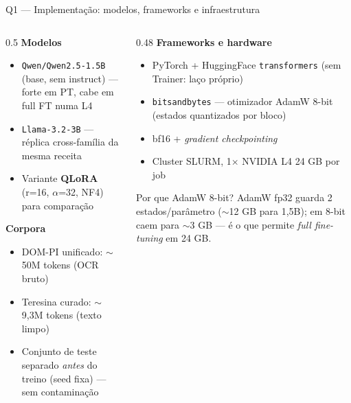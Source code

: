\documentclass[10pt,aspectratio=169]{beamer}
\begin{document}
\begin{frame}{Q1 — Implementação: modelos, frameworks e infraestrutura}
  \begin{columns}[T]
    \begin{column}{0.5\textwidth}
      \textbf{Modelos}
      \begin{itemize}\small
        \item \texttt{Qwen/Qwen2.5-1.5B} (base, sem instruct) — forte em PT, cabe em full FT numa L4
        \item \texttt{Llama-3.2-3B} — réplica cross-família da mesma receita
        \item Variante \textbf{QLoRA} (r=16, $\alpha$=32, NF4) para comparação
      \end{itemize}
      \textbf{Corpora}
      \begin{itemize}\small
        \item DOM-PI unificado: $\sim$50M tokens (OCR bruto)
        \item Teresina curado: $\sim$9,3M tokens (texto limpo)
        \item Conjunto de teste separado \emph{antes} do treino (seed fixa) — sem contaminação
      \end{itemize}
    \end{column}
    \begin{column}{0.48\textwidth}
      \textbf{Frameworks e hardware}
      \begin{itemize}\small
        \item PyTorch + HuggingFace \texttt{transformers} (sem Trainer: laço próprio)
        \item \texttt{bitsandbytes} — otimizador AdamW 8-bit (estados quantizados por bloco)
        \item bf16 + \emph{gradient checkpointing}
        \item Cluster SLURM, 1$\times$ NVIDIA L4 24 GB por job
      \end{itemize}
      \begin{block}{\small Por que AdamW 8-bit?}
        \small AdamW fp32 guarda 2 estados/parâmetro ($\sim$12 GB para 1,5B); em 8-bit caem para $\sim$3 GB — é o que permite \emph{full fine-tuning} em 24 GB.
      \end{block}
    \end{column}
  \end{columns}
\end{frame}
\end{document}
